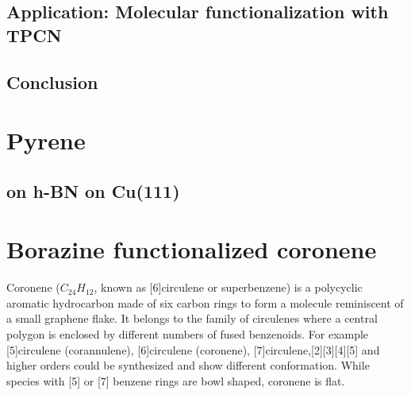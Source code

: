 \documentclass[
twoside,				%
BCOR=8mm,				%
headings=normal,		%
headsepline,			%
footsepline,			%
plainfootsepline,		%
]{scrbook}
\begin{document}
  \section{Application: Molecular functionalization with TPCN}
     
  \section{Conclusion}
     
\chapter{Pyrene}
\section{on h-BN on Cu(111)}

\chapter{Borazine functionalized coronene}
Coronene ($C_{24}H_{12}$, known as [6]circulene or superbenzene) is a polycyclic aromatic hydrocarbon made of six carbon rings to form a molecule reminiscent of a small graphene flake. It belongs to the family of circulenes where a central polygon is enclosed by different numbers of fused benzenoids. For example [5]circulene (corannulene), [6]circulene (coronene), [7]circulene,[2][3][4][5] and higher orders could be synthesized and show different conformation. While species with [5] or [7] benzene rings are bowl shaped, coronene is flat.
\end{document}
